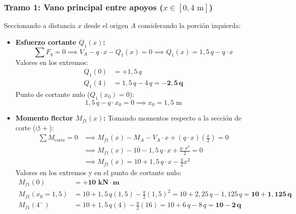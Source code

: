 \subsubsection*{Tramo 1: Vano principal entre apoyos ($x \in [0, 4\text{ m}]$)}
Seccionando a distancia $x$ desde el origen $A$ considerando la porción izquierda:
\begin{itemize}
    \item \textbf{Esfuerzo cortante $Q_1(x)$:}
          \begin{equation}
              \sum F_y = 0 \implies V_A - q \cdot x - Q_1(x) = 0 \implies \boxed{Q_1(x) = 1{,}5\,q - q \cdot x}
          \end{equation}
          Valores en los extremos:
          \begin{align}
              Q_1(0) & = +1{,}5\,q \\[4pt]
              Q_1(4) & = 1{,}5\,q - 4\,q = \mathbf{-2{,}5\,q}
          \end{align}
          Punto de cortante nulo ($Q_1(x_0) = 0$):
          \begin{equation}
              1{,}5\,q - q \cdot x_0 = 0 \implies \boxed{x_0 = 1{,}5\text{ m}}
          \end{equation}
    \item \textbf{Momento flector $M_{f1}(x)$:}
          Tomando momentos respecto a la sección de corte ($\circlearrowleft +$):
          \begin{align}
              \sum M_{\text{corte}} = 0 & \implies M_{f1}(x) - M_A - V_A \cdot x + (q \cdot x)\left(\frac{x}{2}\right) = 0 \nonumber \\
                                        & \implies M_{f1}(x) - 10 - 1{,}5\,q \cdot x + \frac{q \cdot x^2}{2} = 0 \nonumber \\
                                        & \implies \boxed{M_{f1}(x) = 10 + 1{,}5\,q \cdot x - \frac{q}{2}x^2}
          \end{align}
          Valores en los extremos y en el punto de cortante nulo:
          \begin{align}
              M_{f1}(0)          & = \mathbf{+10\text{ kN}\cdot\text{m}} \\[4pt]
              M_{f1}(x_0 = 1{,}5) & = 10 + 1{,}5\,q(1{,}5) - \frac{q}{2}(1{,}5)^2 = 10 + 2{,}25\,q - 1{,}125\,q = \mathbf{10 + 1{,}125\,q} \\[4pt]
              M_{f1}(4^-)        & = 10 + 1{,}5\,q(4) - \frac{q}{2}(16) = 10 + 6\,q - 8\,q = \mathbf{10 - 2\,q}
          \end{align}
\end{itemize}

